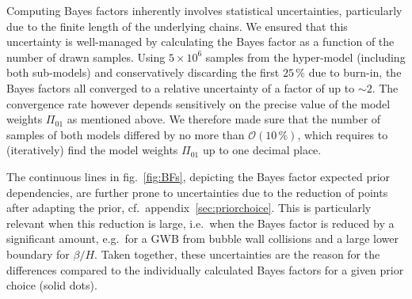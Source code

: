 	Computing Bayes factors inherently involves statistical uncertainties, particularly due to the finite length of the underlying chains. We ensured that this uncertainty is well-managed by calculating the Bayes factor as a function of the number of drawn samples. Using $5 \times 10^6$ samples from the hyper-model (including both sub-models) and  conservatively discarding the first $25 \, \%$ due to burn-in, the Bayes factors all converged to a relative uncertainty of a factor of up to $\sim 2$. The convergence rate however depends sensitively on the precise value of the model weights $\Pi_{01}$ as mentioned above. We therefore made sure that the number of samples of both models differed by no more than $\mathcal{O}(10 \, \%)$, which requires to (iteratively) find the model weights $\Pi_{01}$ up to one decimal place.
	
	The continuous lines in fig.~\ref{fig:BFs}, depicting the Bayes factor expected prior dependencies, are further prone to uncertainties due to the reduction of points after adapting the prior, cf.~appendix~\ref{sec:priorchoice}. This is particularly relevant when this reduction is large, i.e.~when the Bayes factor is reduced by a significant amount, e.g.~for a \ac{GWB} from bubble wall collisions and a large lower boundary for $\beta / H$. Taken together, these uncertainties are the reason for the differences compared to the individually calculated Bayes factors for a given prior choice (solid dots).
	
	

